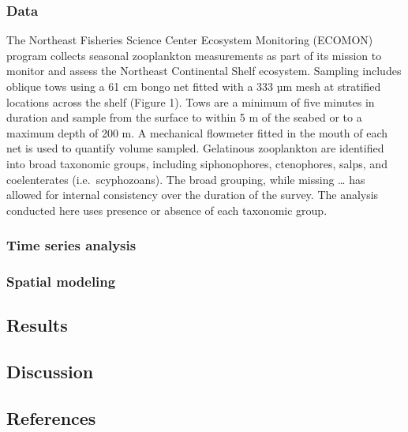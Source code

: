 \documentclass[
]{article}
\begin{document}
\subsubsection{Data}\label{data}

The Northeast Fisheries Science Center Ecosystem Monitoring (ECOMON)
program collects seasonal zooplankton measurements as part of its
mission to monitor and assess the Northeast Continental Shelf ecosystem.
Sampling includes oblique tows using a 61 cm bongo net fitted with a 333
µm mesh at stratified locations across the shelf (Figure 1). Tows are a
minimum of five minutes in duration and sample from the surface to
within 5 m of the seabed or to a maximum depth of 200 m. A mechanical
flowmeter fitted in the mouth of each net is used to quantify volume
sampled. Gelatinous zooplankton are identified into broad taxonomic
groups, including siphonophores, ctenophores, salps, and coelenterates
(i.e.~scyphozoans). The broad grouping, while missing \ldots{} has
allowed for internal consistency over the duration of the survey. The
analysis conducted here uses presence or absence of each taxonomic
group.

\subsubsection{Time series analysis}\label{time-series-analysis}

\subsubsection{Spatial modeling}\label{spatial-modeling}

\subsection{Results}\label{results}

\subsection{Discussion}\label{discussion}

\subsection*{References}\label{references}
\end{document}
